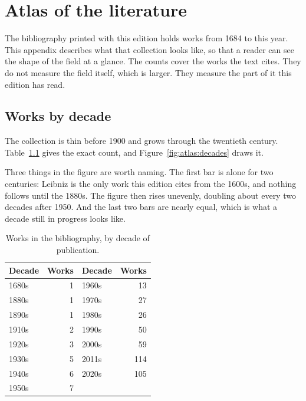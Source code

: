\chapter{Atlas of the literature}\label{app:atlas}
%

The bibliography printed with this edition holds works from 1684 to this year.
This appendix describes what that collection looks like, so that a reader can
see the shape of the field at a glance.
The counts cover the works the text cites.
They do not measure the field itself, which is larger.
They measure the part of it this edition has read.

\section{Works by decade}

The collection is thin before 1900 and grows through the twentieth century.
Table~\ref{tab:atlas:decades} gives the exact count, and
Figure~\ref{fig:atlas:decades} draws it.


Three things in the figure are worth naming. The first bar is alone for two
centuries: Leibniz is the only work this edition cites from the 1600s, and
nothing follows until the 1880s. The figure then rises unevenly, doubling about
every two decades after 1950. And the last two bars are nearly equal, which is
what a decade still in progress looks like.

\begin{table}[htbp]
  \centering
  \caption{Works in the bibliography, by decade of publication.}
  \label{tab:atlas:decades}
  \begin{tabular}{lr@{\qquad}lr}
    \toprule
    Decade & Works & Decade & Works \\
    \midrule
    1680s & 1   & 1960s & 13  \\
    1880s & 1   & 1970s & 27  \\
    1890s & 1   & 1980s & 26  \\
    1910s & 2   & 1990s & 50  \\
    1920s & 3   & 2000s & 59  \\
    1930s & 5   & 2011s & 114 \\
    1940s & 6   & 2020s & 105 \\
    1950s & 7   &       &     \\
    \bottomrule
  \end{tabular}
\end{table}

